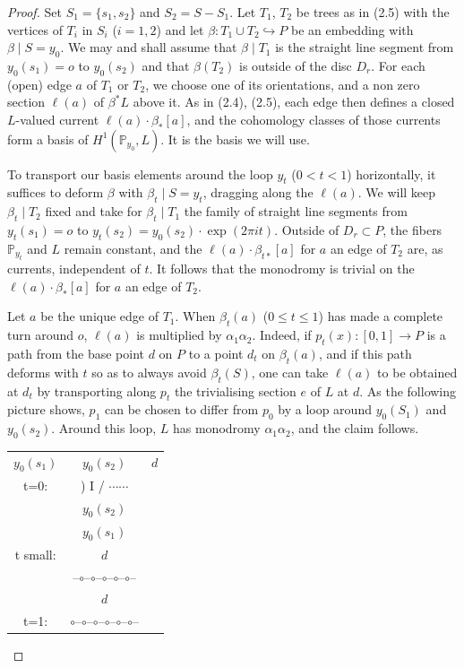 \documentclass[12pt,a4paper]{article}
\theoremstyle{plain}
\theoremstyle{definition}
\theoremstyle{remark}
\begin{document}
\begin{proof}
Set $S_1 = \{s_1, s_2\}$ and $S_2 = S - S_1$. Let $T_1$, $T_2$ be trees as in (2.5) with the vertices of $T_i$ in $S_i$ ($i = 1, 2$) and let $\beta : T_1 \cup T_2 \hookrightarrow P$ be an embedding with $\beta \mid S = y_0$. We may and shall assume that $\beta \mid T_1$ is the straight line segment from $y_0(s_1) = o$ to $y_0(s_2)$ and that $\beta(T_2)$ is outside of the disc $D_r$. For each (open) edge $a$ of $T_1$ or $T_2$, we choose one of its orientations, and a non zero section $\ell(a)$ of $\beta^* L$ above it. As in (2.4), (2.5), each edge then defines a closed $L$-valued current $\ell(a) \cdot \beta_*[a]$, and the cohomology classes of those currents form a basis of $H^1(\mathbb{P}_{y_0}, L)$. It is the basis we will use.

To transport our basis elements around the loop $y_t$ ($0 < t < 1$) horizontally, it suffices to deform $\beta$ with $\beta_t \mid S = y_t$, dragging along the $\ell(a)$. We will keep $\beta_t \mid T_2$ fixed and take for $\beta_t \mid T_1$ the family of straight line segments from $y_t(s_1) = o$ to $y_t(s_2) = y_0(s_2) \cdot \exp(2\pi i t)$. Outside of $D_r \subset P$, the fibers $\mathbb{P}_{y_t}$ and $L$ remain constant, and the $\ell(a) \cdot \beta_{t*}[a]$ for $a$ an edge of $T_2$ are, as currents, independent of $t$. It follows that the monodromy is trivial on the $\ell(a) \cdot \beta_*[a]$ for $a$ an edge of $T_2$.

Let $a$ be the unique edge of $T_1$. When $\beta_t(a)$ ($0 \leqslant t \leqslant 1$) has made a complete turn around $o$, $\ell(a)$ is multiplied by $\alpha_1 \alpha_2$. Indeed, if $p_t(x) : [0, 1] \to P$ is a path from the base point $d$ on $P$ to a point $d_t$ on $\beta_t(a)$, and if this path deforms with $t$ so as to always avoid $\beta_t(S)$, one can take $\ell(a)$ to be obtained at $d_t$ by transporting along $p_t$ the trivialising section $e$ of $L$ at $d$. As the following picture shows, $p_1$ can be chosen to differ from $p_0$ by a loop around $y_0(S_1)$ and $y_0(s_2)$. Around this loop, $L$ has monodromy $\alpha_1 \alpha_2$, and the claim follows.

\begin{center}
\begin{tabular}{ccc}
$y_0(s_1)$ & $y_0(s_2)$ & $d$\\
t=0: & ) I / $\cdots\cdots$ & \\
& $y_0(s_2)$ & \\
& $y_0(s_1)$ & \\
t small: & $d$ & \\
& --$\circ$--$\circ$--$\circ$--$\circ$--$\circ$-- & \\
& $d$ & \\
t=1: & $\circ$--$\circ$--$\circ$--$\circ$--$\circ$--$\circ$-- & \\
\end{tabular}
\end{center}
\end{proof}
\end{document}
